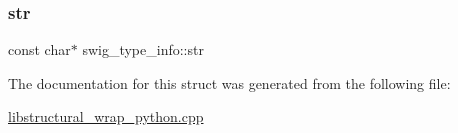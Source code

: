 \mbox{\label{structswig__type__info_abbe7cc58a083feb4329b748643324064}} 
\subsubsection{\texorpdfstring{str}{str}}
{\footnotesize\ttfamily const char$\ast$ swig\+\_\+type\+\_\+info\+::str}



The documentation for this struct was generated from the following file\+:\begin{DoxyCompactItemize}
\item 
\hyperlink{libstructural__wrap__python_8cpp}{libstructural\+\_\+wrap\+\_\+python.\+cpp}\end{DoxyCompactItemize}
